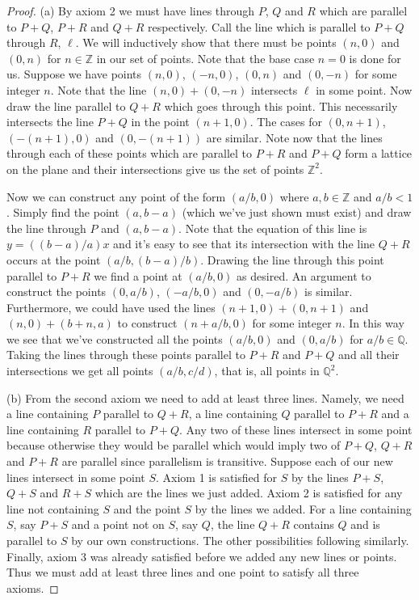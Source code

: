 \documentclass{article}
\begin{document}
\begin{proof}
(a) By axiom 2 we must have lines through $P$, $Q$ and $R$ which are parallel to $P+Q$, $P+R$ and $Q+R$ respectively. Call the line which is parallel to $P+Q$ through $R$, $\ell$.
\vspace{100pt}
We will inductively show that there must be points $(n,0)$ and $(0,n)$ for $n \in \mathbb{Z}$ in our set of points. Note that the base case $n=0$ is done for us. Suppose we have points $(n,0)$, $(-n,0)$, $(0,n)$ and $(0,-n)$ for some integer $n$. Note that the line $(n,0) + (0,-n)$ intersects $\ell$ in some point. Now draw the line parallel to $Q+R$ which goes through this point. This necessarily intersects the line $P+Q$ in the point $(n+1,0)$.
\vspace{100pt}
The cases for $(0,n+1)$, $(-(n+1),0)$ and $(0,-(n+1))$ are similar. Note now that the lines through each of these points which are parallel to $P+R$ and $P+Q$ form a lattice on the plane and their intersections give us the set of points $\mathbb{Z}^2$.

Now we can construct any point of the form $(a/b,0)$ where $a,b \in \mathbb{Z}$ and $a/b < 1$. Simply find the point $(a,b-a)$ (which we've just shown must exist) and draw the line through $P$ and $(a,b-a)$. Note that the equation of this line is $y = ((b-a)/a)x$ and it's easy to see that its intersection with the line $Q+R$ occurs at the point $(a/b, (b-a)/b)$.
\vspace{100pt}
Drawing the line through this point parallel to $P+R$ we find a point at $(a/b,0)$ as desired. An argument to construct the points $(0,a/b)$, $(-a/b,0)$ and $(0,-a/b)$ is similar. Furthermore, we could have used the lines $(n+1,0) + (0,n+1)$ and $(n,0) + (b+n,a)$ to construct $(n+a/b,0)$ for some integer $n$. In this way we see that we've constructed all the points $(a/b,0)$ and $(0,a/b)$ for $a/b \in \mathbb{Q}$. Taking the lines through these points parallel to $P+R$ and $P+Q$ and all their intersections we get all points $(a/b,c/d)$, that is, all points in $\mathbb{Q}^2$.

(b) From the second axiom we need to add at least three lines. Namely, we need a line containing $P$ parallel to $Q+R$, a line containing $Q$ parallel to $P+R$ and a line containing $R$ parallel to $P+Q$. Any two of these lines intersect in some point because otherwise they would be parallel which would imply two of $P+Q$, $Q+R$ and $P+R$ are parallel since parallelism is transitive. Suppose each of our new lines intersect in some point $S$.
\vspace{100pt}
Axiom 1 is satisfied for $S$ by the lines $P+S$, $Q+S$ and $R+S$ which are the lines we just added. Axiom 2 is satisfied for any line not containing $S$ and the point $S$ by the lines we added. For a line containing $S$, say $P+S$ and a point not on $S$, say $Q$, the line $Q+R$ contains $Q$ and is parallel to $S$ by our own constructions. The other possibilities following similarly. Finally, axiom 3 was already satisfied before we added any new lines or points. Thus we must add at least three lines and one point to satisfy all three axioms.
\end{proof}
\end{document}
